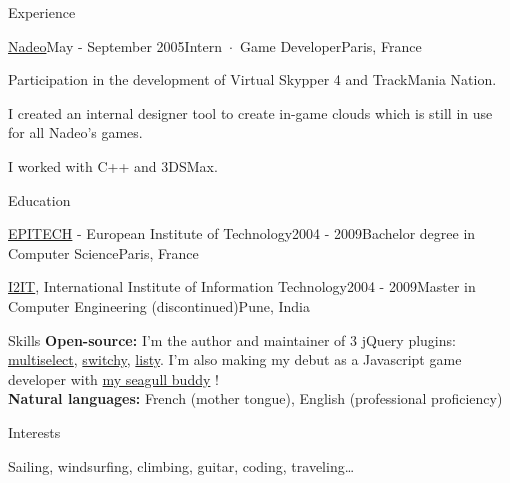 \documentclass{resume} %
\begin{document}
\begin{rSection}{Experience}
\begin{rSubsection}{\href{http://nadeo.com}{Nadeo}}{May - September 2005}{Intern~$\cdot$~Game Developer}{Paris, France}
\item Participation in the development of Virtual Skypper 4 and TrackMania Nation.
\item I created an internal designer tool to create in-game clouds which is still in use for all Nadeo's games.
\item I worked with C++ and 3DSMax.
\end{rSubsection}


\end{rSection}

\begin{rSection}{Education}

\begin{rSubsection}{\href{http://epitech.com}{EPITECH} - European Institute of Technology}{2004 - 2009}{Bachelor degree in Computer Science}{Paris, France}
\item
\end{rSubsection}
\begin{rSubsection}{\href{http://www.isquareit.ac.in/}{I2IT}, International Institute of Information Technology}{2004 - 2009}{Master in Computer Engineering (discontinued)}{Pune, India}
\item
\end{rSubsection}


\end{rSection}

\begin{rSection}{Skills}
\textbf{Open-source:}
I'm the author and maintainer of 3 jQuery plugins: \href{http://loudev.com}{multiselect}, \href{https://github.com/lou/switchy}{switchy}, \href{https://github.com/lou/listy}{listy}.
I'm also making my debut as a Javascript game developer with \href{http://lou.github.io/seagull/}{my seagull buddy} !\\

\textbf{Natural languages:}
French (mother tongue), English (professional proﬁciency)

\end{rSection}


\begin{rSection}{Interests}

Sailing, windsurfing, climbing, guitar, coding, traveling\ldots

\end{rSection}

\end{document}

